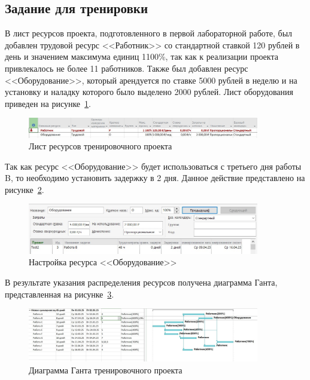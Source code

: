 \subsection{Задание для тренировки}

В лист ресурсов проекта, подготовленного в первой лабораторной работе, был добавлен трудовой ресурс <<Работник>> со стандартной ставкой 120 рублей в день и значением максимума единиц 1100\%, так как к реализации проекта привлекалось не более 11 работников.
Также был добавлен ресурс <<Оборудование>>, который арендуется по ставке 5000 рублей в неделю и на установку и наладку которого было выделено 2000 рублей.
Лист оборудования приведен на рисунке~\ref{fig:test_list}.

\begin{figure}[H]
	\centering
	\includegraphics[width=0.9\textwidth]{img/lab2/test/equipment.jpg}
	\caption{Лист ресурсов тренировочного проекта}
	\label{fig:test_list}
\end{figure}

Так как ресурс <<Оборудование>> будет использоваться с третьего дня работы B, то необходимо установить задержку в 2 дня.
Данное действие представлено на рисунке~\ref{fig:test_delay}.

\begin{figure}[H]
	\centering
	\includegraphics[width=0.9\textwidth]{img/lab2/test/delay.jpg}
	\caption{Настройка ресурса <<Оборудование>>}
	\label{fig:test_delay}
\end{figure}

В результате указания распределения ресурсов получена диаграмма Ганта, представленная на рисунке~\ref{fig:test_gant}.

\begin{figure}[H]
	\centering
	\includegraphics[width=0.9\textwidth]{img/lab2/test/add_worker.jpg}
	\caption{Диаграмма Ганта тренировочного проекта}
	\label{fig:test_gant}
\end{figure}

